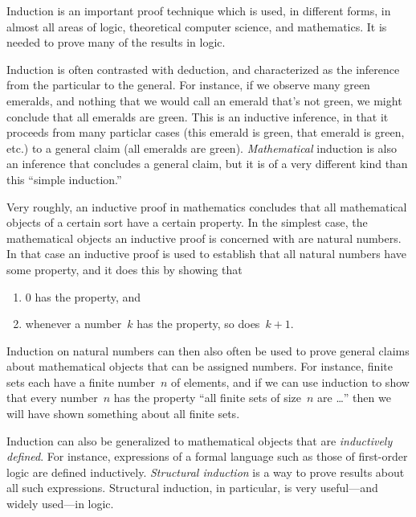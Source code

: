\documentclass[../../../include/open-logic-section]{subfiles}
\begin{document}


Induction is an important proof technique which is used, in different
forms, in almost all areas of logic, theoretical computer science, and
mathematics.  It is needed to prove many of the results in logic.

Induction is often contrasted with deduction, and characterized as the
inference from the particular to the general.  For instance, if we
observe many green emeralds, and nothing that we would call an emerald
that's not green, we might conclude that all emeralds are green. This
is an inductive inference, in that it proceeds from many particlar
cases (this emerald is green, that emerald is green, etc.) to a
general claim (all emeralds are green).  \emph{Mathematical} induction
is also an inference that concludes a general claim, but it is of a
very different kind than this ``simple induction.''

Very roughly, an inductive proof in mathematics concludes that all
mathematical objects of a certain sort have a certain property.  In
the simplest case, the mathematical objects an inductive proof is
concerned with are natural numbers.  In that case an inductive proof
is used to establish that all natural numbers have some property, and
it does this by showing that
\begin{enumerate}
    \item $0$ has the property, and
    \item whenever a number~$k$ has the property, so does~$k+1$.
\end{enumerate}
Induction on natural numbers can then also often be used to prove
general claims about mathematical objects that can be assigned numbers. For
instance, finite sets each have a finite number~$n$ of elements, and
if we can use induction to show that every number~$n$ has the property
``all finite sets of size~$n$ are \dots'' then we will have shown
something about all finite sets.

Induction can also be generalized to mathematical objects that are
\emph{inductively defined}.  For instance, expressions of a formal
language such as those of first-order logic are defined inductively.
\emph{Structural induction} is a way to prove results about all such
expressions.  Structural induction, in particular, is very
useful---and widely used---in logic.
\end{document}
